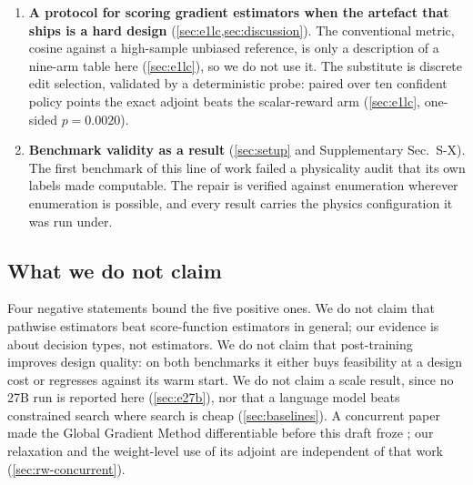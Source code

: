 \begin{enumerate}
\item \textbf{A protocol for scoring gradient estimators when the artefact
  that ships is a hard design} (\cref{sec:e1lc,sec:discussion}).  The
  conventional metric, cosine against a high-sample unbiased reference, is only
  a description of a nine-arm table here (\cref{sec:e1lc}), so we do not use it.
  The substitute is discrete edit selection, validated by a deterministic probe:
  paired over ten confident policy points the exact adjoint beats the
  scalar-reward arm (\cref{sec:e1lc}, one-sided $p=0.0020$).

\item \textbf{Benchmark validity as a result} (\cref{sec:setup} and
  Supplementary Sec.~S-X).  The first benchmark of this line of work failed a
  physicality audit that its own labels made computable.  The repair is verified
  against enumeration wherever enumeration is possible, and every result carries
  the physics configuration it was run under.

\end{enumerate}

\subsection{What we do not claim}
\label{sec:notclaim}

Four negative statements bound the five positive ones.  We do not claim that
pathwise estimators beat score-function estimators in general; our evidence is
about decision types, not estimators.  We do not claim that post-training
improves design quality: on both benchmarks it either buys feasibility at a
design cost or regresses against its warm start.  We do not claim a scale
result, since no 27B run is reported here
(\cref{sec:e27b}), nor that a language model beats constrained search where
search is cheap (\cref{sec:baselines}).  A concurrent paper made the Global
Gradient Method differentiable before this draft froze \cite{mu2026gga}; our
relaxation and the weight-level use of its adjoint are independent of that work
(\cref{sec:rw-concurrent}).
